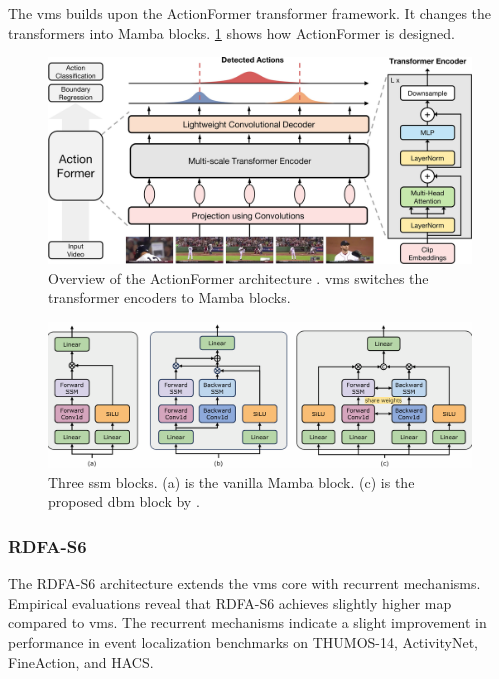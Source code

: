 The \acrlong{vms} builds upon the ActionFormer transformer framework. It changes the transformers into Mamba blocks. \cref{fig:actionformer_architecture} shows how ActionFormer is designed. 

\begin{figure}
    \centering
    \includegraphics[width=1\linewidth]{figures/actionformer_architecture.jpg}
    \caption{Overview of the ActionFormer architecture \cite{zhang_actionformer_2022} . \acrshort{vms} switches the transformer encoders to Mamba blocks. }
    \label{fig:actionformer_architecture}
\end{figure}

\begin{figure}
    \centering
    \includegraphics[width=1\linewidth]{figures/mamba_ssm.png}
    \caption{Three \acrshort{ssm} blocks. (a) is the vanilla Mamba block\cite{gu_mamba_2024}. (c) is the proposed \acrshort{dbm} block by \textcite{li_videomamba_2024}.}
    \label{fig:mamba_ssm}
\end{figure}

\subsubsection{RDFA-S6}
The RDFA-S6 architecture extends the \acrshort{vms} core with recurrent mechanisms. Empirical evaluations reveal that RDFA-S6 achieves slightly higher \acrlong{map} compared to \acrshort{vms}. The recurrent mechanisms indicate a slight improvement in performance in event localization benchmarks on THUMOS-14, ActivityNet, FineAction, and HACS. 

